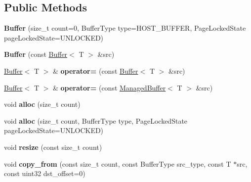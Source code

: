 \subsection*{Public Methods}
\begin{DoxyCompactItemize}
\item 
\mbox{\label{class_buffer_a6b5de7c51749ed2aecf4e12066bc869c}} 
{\bfseries Buffer} (size\+\_\+t count=0, Buffer\+Type type=H\+O\+S\+T\+\_\+\+B\+U\+F\+F\+ER, Page\+Locked\+State page\+Locked\+State=U\+N\+L\+O\+C\+K\+ED)
\item 
\mbox{\label{class_buffer_ab2489e340cc0403f9f27163ecc7579a1}} 
{\bfseries Buffer} (const \hyperlink{class_buffer}{Buffer}$<$ T $>$ \&src)
\item 
\mbox{\label{class_buffer_af2fab9ed39cf9bf278de4ec76584b3c6}} 
\hyperlink{class_buffer}{Buffer}$<$ T $>$ \& {\bfseries operator=} (const \hyperlink{class_buffer}{Buffer}$<$ T $>$ \&src)
\item 
\mbox{\label{class_buffer_a5df8c9dee01bef8fa87a7a3655e70362}} 
\hyperlink{class_buffer}{Buffer}$<$ T $>$ \& {\bfseries operator=} (const \hyperlink{class_managed_buffer}{Managed\+Buffer}$<$ T $>$ \&src)
\item 
\mbox{\label{class_buffer_a3924bf143f8775be409c9eb1e8d9dfba}} 
void {\bfseries alloc} (size\+\_\+t count)
\item 
\mbox{\label{class_buffer_a1f68a9766127c1ee4858f11d18b59fa4}} 
void {\bfseries alloc} (size\+\_\+t count, Buffer\+Type type, Page\+Locked\+State page\+Locked\+State=U\+N\+L\+O\+C\+K\+ED)
\item 
\mbox{\label{class_buffer_a0777b8a1efb8952938ffb3213c3d1987}} 
void {\bfseries resize} (const size\+\_\+t count)
\item 
\mbox{\label{class_buffer_a8ce00ff6dd7cacc009970dea7fa834d1}} 
void {\bfseries copy\+\_\+from} (const size\+\_\+t count, const Buffer\+Type src\+\_\+type, const T $\ast$src, const uint32 dst\+\_\+offset=0)
\item 
\mbox{\label{class_buffer_a3327c2b8a3d86b4bd8a1962c81887a4f}} 

\end{DoxyCompactItemize}
